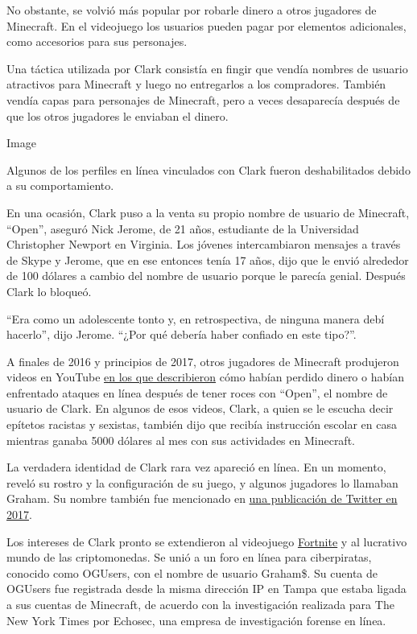 No obstante, se volvió más popular por robarle dinero a otros jugadores
de Minecraft. En el videojuego los usuarios pueden pagar por elementos
adicionales, como accesorios para sus personajes.

Una táctica utilizada por Clark consistía en fingir que vendía nombres
de usuario atractivos para Minecraft y luego no entregarlos a los
compradores. También vendía capas para personajes de Minecraft, pero a
veces desaparecía después de que los otros jugadores le enviaban el
dinero.

Image

Algunos de los perfiles en línea vinculados con Clark fueron
deshabilitados debido a su comportamiento.

En una ocasión, Clark puso a la venta su propio nombre de usuario de
Minecraft, ``Open'', aseguró Nick Jerome, de 21 años, estudiante de la
Universidad Christopher Newport en Virginia. Los jóvenes intercambiaron
mensajes a través de Skype y Jerome, que en ese entonces tenía 17 años,
dijo que le envió alrededor de 100 dólares a cambio del nombre de
usuario porque le parecía genial. Después Clark lo bloqueó.

``Era como un adolescente tonto y, en retrospectiva, de ninguna manera
debí hacerlo'', dijo Jerome. ``¿Por qué debería haber confiado en este
tipo?''.

A finales de 2016 y principios de 2017, otros jugadores de Minecraft
produjeron videos en YouTube
\href{https://www.youtube.com/watch?v=CvrPXbk-BXw}{en los que
describieron} cómo habían perdido dinero o habían enfrentado ataques en
línea después de tener roces con ``Open'', el nombre de usuario de
Clark. En algunos de esos videos, Clark, a quien se le escucha decir
epítetos racistas y sexistas, también dijo que recibía instrucción
escolar en casa mientras ganaba 5000 dólares al mes con sus actividades
en Minecraft.

La verdadera identidad de Clark rara vez apareció en línea. En un
momento, reveló su rostro y la configuración de su juego, y algunos
jugadores lo llamaban Graham. Su nombre también fue mencionado en
\href{https://twitter.com/opengrahamclark/status/848014008632344576}{una
publicación de Twitter en 2017}.

Los intereses de Clark pronto se extendieron al videojuego
\href{https://www.nytimes3xbfgragh.onion/2018/07/25/arts/what-is-fortnite-battle-royale-nyt.html}{Fortnite}
y al lucrativo mundo de las criptomonedas. Se unió a un foro en línea
para ciberpiratas, conocido como OGUsers, con el nombre de usuario
Graham\$. Su cuenta de OGUsers fue registrada desde la misma dirección
IP en Tampa que estaba ligada a sus cuentas de Minecraft, de acuerdo con
la investigación realizada para The New York Times por Echosec, una
empresa de investigación forense en línea.

